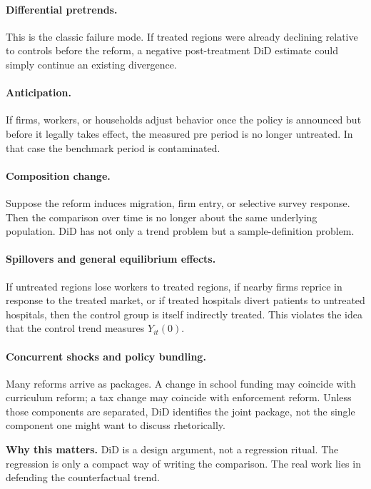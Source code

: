 \paragraph{Differential pretrends.}
This is the classic failure mode. If treated regions were already declining relative to controls before the reform, a negative post-treatment \ac{DiD} estimate could simply continue an existing divergence.

\paragraph{Anticipation.}
If firms, workers, or households adjust behavior once the policy is announced but before it legally takes effect, the measured pre period is no longer untreated. In that case the benchmark period is contaminated.

\paragraph{Composition change.}
Suppose the reform induces migration, firm entry, or selective survey response. Then the comparison over time is no longer about the same underlying population. \ac{DiD} has not only a trend problem but a sample-definition problem.

\paragraph{Spillovers and general equilibrium effects.}
If untreated regions lose workers to treated regions, if nearby firms reprice in response to the treated market, or if treated hospitals divert patients to untreated hospitals, then the control group is itself indirectly treated. This violates the idea that the control trend measures $Y_{it}(0)$.

\paragraph{Concurrent shocks and policy bundling.}
Many reforms arrive as packages. A change in school funding may coincide with curriculum reform; a tax change may coincide with enforcement reform. Unless those components are separated, \ac{DiD} identifies the joint package, not the single component one might want to discuss rhetorically.

\begin{boxD}
\textbf{Why this matters.}
\ac{DiD} is a design argument, not a regression ritual. The regression is only a compact way of writing the comparison. The real work lies in defending the counterfactual trend.
\end{boxD}

